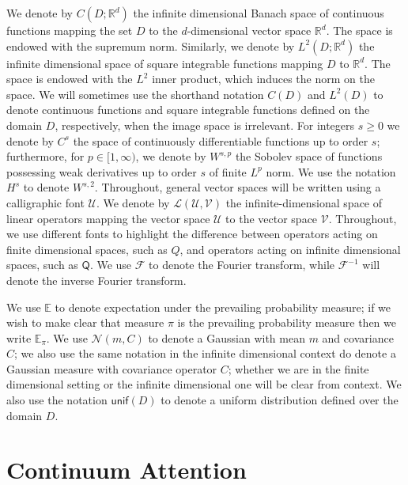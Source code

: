 \documentclass[twoside]{article}
\newcommand{\1}{\mathbbm{1}}
\newcommand{\R}{\mathbbm{R}}
\newcommand{\cU}{\mathcal{U}}
\newcommand{\cL}{\mathcal{L}}
\newcommand{\cV}{\mathcal{V}}
\newcommand{\sQ}{\mathsf{Q}}
\newcommand{\cF}{\mathcal{F}}
\newcommand{\bbE}{\mathbb{E}}
\providecommand{\mathbbm}{\mathbb} %
\newcommand{\unif}{\mathsf{unif}}
\begin{document}
We denote by $C(D;\R^d)$ the infinite dimensional Banach space of continuous functions mapping the set $D$ to the $d$-dimensional vector space $\R^d$. The space is endowed with the supremum norm. Similarly, we denote by $L^2(D;\R^d)$ the infinite dimensional space of square integrable functions mapping $D$ to $\R^d$. The space is endowed with the $L^2$ inner product, which induces the norm on the space. We will sometimes use the shorthand notation $C(D)$ and $L^2(D)$ to denote continuous functions and square integrable functions defined on the domain $D$, respectively, when the image space is irrelevant. For integers $s\geq0$ we denote by $C^s$ the space of continuously differentiable functions up to order $s$; furthermore, for $p\in [1,\infty)$, we denote by $W^{s,p}$ the Sobolev space of functions possessing weak derivatives up to order $s$ of finite $L^p$ norm. We use the notation $H^s$ to denote $W^{s,2}$. Throughout, general vector spaces will be written using a calligraphic font $\cU$. We denote by $\cL(\cU,\cV)$ the infinite-dimensional space of linear operators mapping the vector space $\cU$ to the vector space $\cV$. Throughout, we use different fonts to highlight the difference between operators acting on finite dimensional spaces, such as $Q$, and operators acting on infinite dimensional spaces, such as $\sQ$. We use $\cF$ to denote the Fourier transform, while $\cF^{-1}$ will denote the inverse Fourier transform.

We use $\bbE$ to denote expectation under
the prevailing probability measure; if we wish to make clear
that measure $\pi$ is the prevailing probability measure then we
write $\bbE_\pi$. We use $\mathcal{N}(m,C)$ to denote a Gaussian with mean $m$ and covariance $C$; we also use the same notation in the infinite dimensional context do denote a Gaussian measure with covariance operator $C$; whether we are in the finite dimensional setting or the infinite dimensional one will be clear from context. We also use the notation $\unif(D)$ to denote a uniform distribution defined over the domain $D$. 


\section{Continuum Attention}
\label{sec:attention}
\end{document}
